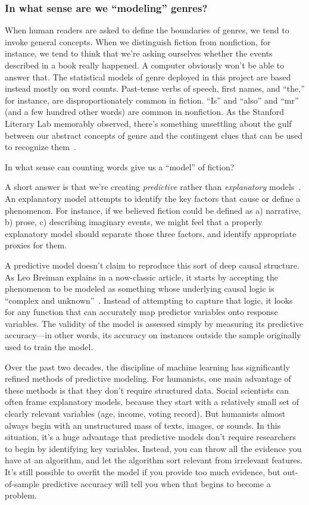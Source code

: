\documentclass[paper=a4, fontsize=12pt]{scrartcl}
\numberwithin{equation}{section}		%
\numberwithin{figure}{section}			%
\numberwithin{table}{section}				%
\begin{document}
\subsubsection{In what sense are we ``modeling'' genres?}

When human readers are asked to define the boundaries of genres, we tend to invoke general concepts. When we distinguish fiction from nonfiction, for instance, we tend to think that we're asking ourselves whether the events described in a book really happened. A computer obviously won't be able to answer that. The statistical models of genre deployed in this project are based instead mostly on word counts. Past-tense verbs of speech, first names, and ``the,'' for instance, are disproportionately common in fiction. ``Is'' and ``also'' and ``mr'' (and a few hundred other words) are common in nonfiction. As the Stanford Literary Lab memorably observed, there's something unsettling about the gulf between our abstract concepts of genre and the contingent clues that can be used to recognize them~\cite{litlab:quantitative-formalism}.

In what sense can counting words give us a ``model'' of fiction?

A short answer is that we're creating \textit{predictive} rather than \textit{explanatory} models~\cite{shmueli:explain}. An explanatory model attempts to identify the key factors that cause or define a phenomenon. For instance, if we believed fiction could be defined as a) narrative, b) prose, c) describing imaginary events, we might feel that a properly explanatory model should separate those three factors, and identify appropriate proxies for them.

A predictive model doesn't claim to reproduce this sort of deep causal structure. As Leo Breiman explains in a now-classic article, it starts by accepting the phenomenon to be modeled as something whose underlying causal logic is ``complex and unknown''~\cite{breiman:modeling}. Instead of attempting to capture that logic, it looks for any function that can accurately map predictor variables onto response variables. The validity of the model is assessed simply by measuring its predictive accuracy---in other words, its accuracy on instances outside the sample originally used to train the model.

Over the past two decades, the discipline of machine learning has significantly refined methods of predictive modeling. For humanists, one main advantage of these methods is that they don't require structured data. Social scientists can often frame explanatory models, because they start with a relatively small set of clearly relevant variables (age, income, voting record). But humanists almost always begin with an unstructured mass of texts, images, or sounds. In this situation, it's a huge advantage that predictive models don't require researchers to begin by identifying key variables. Instead, you can throw all the evidence you have at an algorithm, and let the algorithm sort relevant from irrelevant features. It's still possible to overfit the model if you provide too much evidence, but out-of-sample predictive accuracy will tell you when that begins to become a problem.
\end{document}
